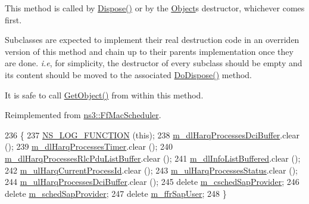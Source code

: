 This method is called by \hyperlink{classns3_1_1Object_aa90ae598863f6c251cdab3c3722afdaf}{Dispose()} or by the \hyperlink{classns3_1_1Object}{Object}\textquotesingle{}s destructor, whichever comes first.

Subclasses are expected to implement their real destruction code in an overriden version of this method and chain up to their parent\textquotesingle{}s implementation once they are done. {\itshape i.\+e}, for simplicity, the destructor of every subclass should be empty and its content should be moved to the associated \hyperlink{classns3_1_1PfFfMacScheduler_a8dcc458e09d58658d878ac38e6ab53b2}{Do\+Dispose()} method.

It is safe to call \hyperlink{classns3_1_1Object_a13e18c00017096c8381eb651d5bd0783}{Get\+Object()} from within this method. 

Reimplemented from \hyperlink{classns3_1_1FfMacScheduler_a771411e455992b81d8399681779debd9}{ns3\+::\+Ff\+Mac\+Scheduler}.


\begin{DoxyCode}
236 \{
237   \hyperlink{log-macros-disabled_8h_a90b90d5bad1f39cb1b64923ea94c0761}{NS\_LOG\_FUNCTION} (\textcolor{keyword}{this});
238   \hyperlink{classns3_1_1PfFfMacScheduler_af3c0c393dc246b7b6a907539362c935b}{m\_dlHarqProcessesDciBuffer}.clear ();
239   \hyperlink{classns3_1_1PfFfMacScheduler_ab115ef9abb936f35aeb5979a8ed8928d}{m\_dlHarqProcessesTimer}.clear ();
240   \hyperlink{classns3_1_1PfFfMacScheduler_acf9952b5bb3d26644b5e25054ca6e385}{m\_dlHarqProcessesRlcPduListBuffer}.clear ();
241   \hyperlink{classns3_1_1PfFfMacScheduler_af3c266623addc28fc6ecd97901183a2f}{m\_dlInfoListBuffered}.clear ();
242   \hyperlink{classns3_1_1PfFfMacScheduler_aff9dac165a5c80c99f237adf365321d6}{m\_ulHarqCurrentProcessId}.clear ();
243   \hyperlink{classns3_1_1PfFfMacScheduler_a5d5e9dcdbb7d0a291fe397ba7b746d04}{m\_ulHarqProcessesStatus}.clear ();
244   \hyperlink{classns3_1_1PfFfMacScheduler_a694ef4299832b3652468b0898601b2de}{m\_ulHarqProcessesDciBuffer}.clear ();
245   \textcolor{keyword}{delete} \hyperlink{classns3_1_1PfFfMacScheduler_a18621fc8ff9d0fc2ff92977f9ac60b2b}{m\_cschedSapProvider};
246   \textcolor{keyword}{delete} \hyperlink{classns3_1_1PfFfMacScheduler_aa647c4209dac594ac05c56ec0335b692}{m\_schedSapProvider};
247   \textcolor{keyword}{delete} \hyperlink{classns3_1_1PfFfMacScheduler_a6a08e9753aa517cced82305cd4fbc0ec}{m\_ffrSapUser};
248 \}
\end{DoxyCode}
